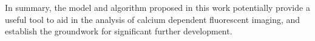 


In summary, the model and algorithm proposed in this work potentially provide a useful tool to aid in the analysis of calcium dependent fluorescent imaging, and establish the groundwork for significant further development.

























